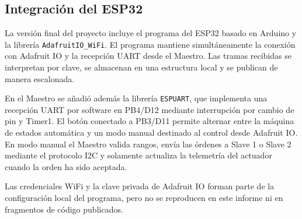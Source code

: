 \subsection{Integración del ESP32}
La versión final del proyecto incluye el programa del ESP32 basado en Arduino y la librería \texttt{AdafruitIO\_WiFi}. El programa mantiene simultáneamente la conexión con Adafruit IO y la recepción UART desde el Maestro. Las tramas recibidas se interpretan por clave, se almacenan en una estructura local y se publican de manera escalonada.

En el Maestro se añadió además la librería \texttt{ESPUART}, que implementa una recepción UART por software en PB4/D12 mediante interrupción por cambio de pin y Timer1. El botón conectado a PB3/D11 permite alternar entre la máquina de estados automática y un modo manual destinado al control desde Adafruit IO. En modo manual el Maestro valida rangos, envía las órdenes a Slave 1 o Slave 2 mediante el protocolo I2C y solamente actualiza la telemetría del actuador cuando la orden ha sido aceptada.

Las credenciales WiFi y la clave privada de Adafruit IO forman parte de la configuración local del programa, pero no se reproducen en este informe ni en fragmentos de código publicados.
